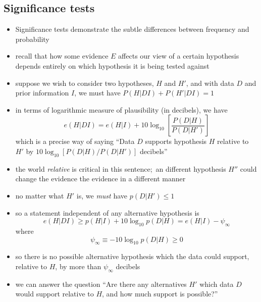 \documentclass[../jaynes_prob_theory_notes.tex]{subfiles}
\begin{document}
        \subsection{Significance tests}
            \begin{itemize}
                \item Significance tests demonstrate the subtle differences between frequency and probability
                \item recall that how some evidence $E$ affects our view of a certain hypothesis depends entirely on which hypothesis it is being tested against
                \item suppose we wish to consider two hypotheses, $H$ and $H'$, and with data $D$ and prior information $I$, we must have $P(H|DI) + P(H'|DI) = 1$
                \item in terms of logarithmic measure of plausibility (in decibels), we have
                    \begin{equation*}
                        e(H|DI) = e(H|I) + 10 \log_{10} \left[ \frac{P(D|H)}{P(D|H')} \right]
                    \end{equation*}
                    which is a precise way of saying ``Data $D$ supports hypothesis $H$ relative to $H'$ by $10 \log_{10} [P(D|H)/P(D|H')]$ decibels''
                \item the world \textit{relative} is critical in this sentence;\ an different hypothesis $H''$ could change the evidence the evidence in a different manner
                \item no matter what $H'$ is, we \textit{must} have $p(D|H') \leq 1$
                \item so a statement independent of any alternative hypothesis is
                    \begin{equation*}
                        e(H|DI) \geq p(H|I) + 10\log_{10} p(D|H) = e(H|I) - {\psi}_{\infty}
                    \end{equation*}
                    where 
                    \begin{equation*}
                        {\psi}_{\infty} \equiv -10 \log_{10} p(D|H) \geq 0
                    \end{equation*}
                \item so there is no possible alternative hypothesis which the data could support, relative to $H$, by more than ${\psi}_{\infty}$ decibels
                \item we can answer the question ``Are there any alternatives $H'$ which data $D$ would support relative to $H$, and how much support is possible?''

\end{itemize}
\end{document}

